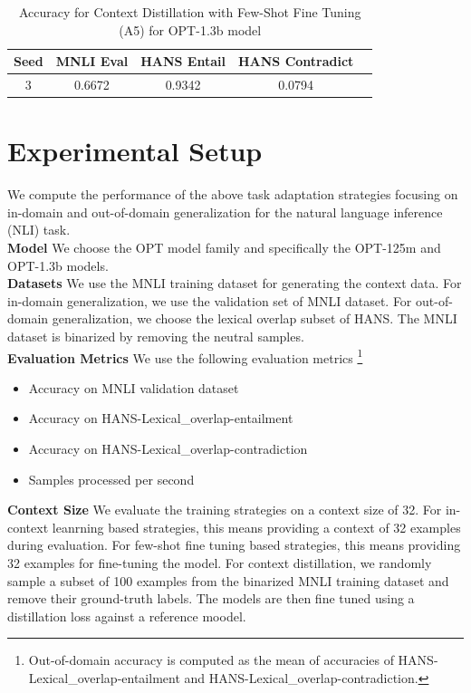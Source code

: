 \documentclass[10pt,twocolumn,letterpaper]{article}
\begin{document}
	\begin{table}[h!]
	\begin{center}
	\begin{tabular}{|c|c|c|c|c|}
	\hline
	\textbf{Seed} & \textbf{MNLI Eval} & \textbf{HANS Entail} & \textbf{HANS Contradict} \\
	\hline
	\hline
	3 & 0.6672 & 0.9342 & 0.0794 \\
	\hline
	\end{tabular}
	\end{center}
	\caption{Accuracy for Context Distillation with Few-Shot Fine Tuning (A5) for OPT-1.3b model}
	\end{table}

\section{Experimental Setup}
We compute the performance of the above task adaptation strategies focusing on in-domain and out-of-domain generalization for the natural language inference (NLI) task.\\
\textbf{Model} We choose the OPT model family and specifically the OPT-125m and OPT-1.3b models.\\
\textbf{Datasets} We use the MNLI training dataset for generating the context data. For in-domain generalization, we use the validation set of MNLI dataset. For out-of-domain generalization, we choose the lexical overlap subset of HANS. The MNLI dataset is binarized by removing the neutral samples.\\
\textbf{Evaluation Metrics} We use the following evaluation metrics
\footnote{Out-of-domain accuracy is computed as the mean of accuracies of HANS-Lexical\_overlap-entailment and HANS-Lexical\_overlap-contradiction.}
\begin{itemize}
    \item Accuracy on MNLI validation dataset
    \item Accuracy on HANS-Lexical\_overlap-entailment
    \item Accuracy on HANS-Lexical\_overlap-contradiction
    \item Samples processed per second
\end{itemize}
\textbf{Context Size} We evaluate the training strategies on a context size of 32. For in-context leanrning based strategies, this means providing a context of 32 examples during evaluation. For few-shot fine tuning based strategies, this means providing 32 examples for fine-tuning the model. For context distillation, we randomly sample a subset of 100 examples from the binarized MNLI training dataset and remove their ground-truth labels. The models are then fine tuned using a distillation loss against a reference moodel.\\
\end{document}
